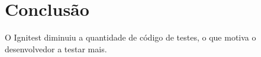 \chapter{Conclusão}

  O Ignitest diminuiu a quantidade de código de testes, o que motiva o desenvolvedor a testar mais.